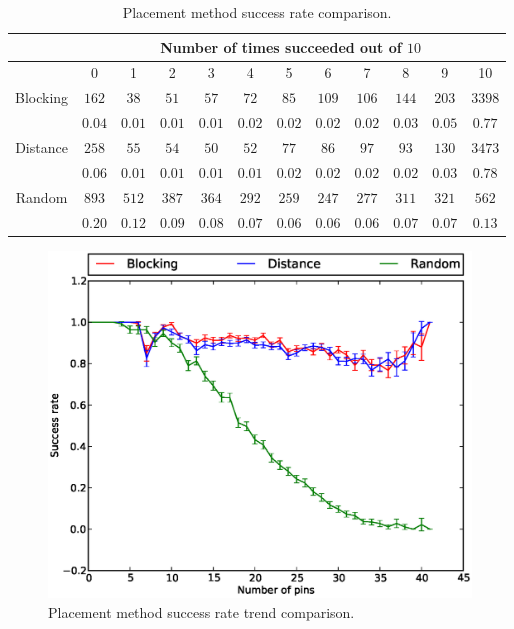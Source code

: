 \begin{table}[H]
\begin{center}
\begin{singlespace}
\begin{tabular}{|c||c|c|c|c|c|c|c|c|c|c|c|}
\hline
 & \multicolumn{11}{|c|}{Number of times succeeded out of $10$} \\
\hline
 & 0 & 1 & 2 & 3 & 4 & 5 & 6 & 7 & 8 & 9 & 10 \\
\hline\hline
Blocking & $162$ & $38$ & $51$ & $57$ & $72$ & $85$ & $109$ & $106$ & $144$ & $203$ & $3398$ \\
 & $0.04$ & $0.01$ & $0.01$ & $0.01$ & $0.02$ & $0.02$ & $0.02$ & $0.02$ & $0.03$ & $0.05$ & $0.77$ \\
\hline
 Distance & $258$ & $55$ & $54$ & $50$ & $52$ & $77$ & $86$ & $97$ & $93$ & $130$ & $3473$ \\
  & $0.06$ & $0.01$ & $0.01$ & $0.01$ & $0.01$ & $0.02$ & $0.02$ & $0.02$ & $0.02$ & $0.03$ & $0.78$ \\
\hline
  Random & $893$ & $512$ & $387$ & $364$ & $292$ & $259$ & $247$ & $277$ & $311$ & $321$ & $562$ \\
   & $0.20$ & $0.12$ & $0.09$ & $0.08$ & $0.07$ & $0.06$ & $0.06$ & $0.06$ & $0.07$ & $0.07$ & $0.13$ \\
\hline
\end{tabular}
\end{singlespace}
\end{center}
\label{tb:placement_success}
\caption[Placement method success rate comparison]{Placement method success rate
comparison.}
\end{table}

\begin{figure}[H]
\begin{center}
\includegraphics[width=\textwidth]{Images/placement_success_trend_comparison.eps}
\caption[Placement method success rate trend comparison]{Placement method
success rate trend comparison.}
\label{fig:placement_success_trend}
\end{center}
\end{figure}


